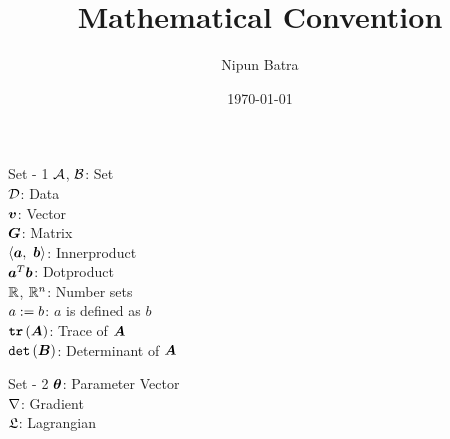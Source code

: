 \documentclass{beamer}
\title{Mathematical Convention}
\date{\today}
\author{Nipun Batra}
\institute{IIT Gandhinagar}
\begin{document}
	\maketitle
	
	\begin{frame}{Set - 1}
		$\mathcal{A}$, $\mathcal{B}$: Set \\
		$\mathcal{D}$: Data \\
		$\bm{v}$: Vector \\
		$\bm{G}$: Matrix \\
		$\langle\bm{a}, \ \bm{b}\rangle$: Innerproduct \\
		$\bm{a}^T\bm{b}$: Dotproduct \\
		$\mathbb{R}$, $\mathbb{R}^n$: Number sets \\
		$a:= b$: $a$ is defined as $b$\\
		$\texttt{\textbf{tr}}\left(\bm{A}\right)$: Trace of $\bm{A}$ \\
		$\texttt{det}\left(\bm{B}\right)$: Determinant of $\bm{A}$
	\end{frame}

	\begin{frame}{Set - 2}
		$\bm{\theta}$: Parameter Vector \\
		$\nabla$: Gradient \\
		$\mathfrak{L}$: Lagrangian \\
	\end{frame}
\end{document}
